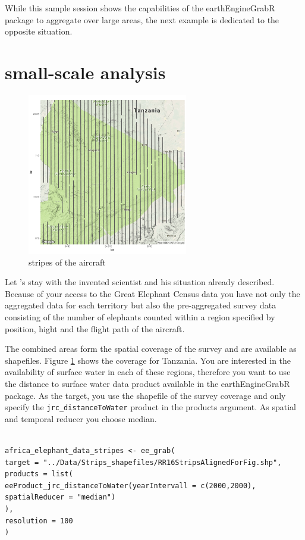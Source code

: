 While this sample session shows the capabilities of the earthEngineGrabR package to aggregate over large areas, the next example is dedicated to the opposite situation. 

\section{small-scale analysis}

\begin{figure}
	\begin{center}
		\includegraphics[width=7cm]{images/stripes-cropped.pdf}
		\caption{stripes of the aircraft}
		\label{stripes}
	\end{center}
\end{figure}


Let 's stay with the invented scientist and his situation already described. Because of your access to the Great Elephant Census data you have not only the aggregated data for each territory but also the pre-aggregated survey data consisting of the number of elephants counted within a region specified by position, hight and the flight path of the aircraft.
	

The combined areas form the spatial coverage of the survey and are available as shapefiles.
Figure \ref{stripes} shows the coverage for Tanzania. You are interested in the availability of surface water in each of these regions, therefore you want to use the distance to surface water data product available in the earthEngineGrabR package. 
As the target, you use the shapefile of the survey coverage and only specify the \texttt{jrc\_distanceToWater} product in the products argument. As spatial and temporal reducer you choose median. 

\begin{lstlisting}

africa_elephant_data_stripes <- ee_grab(
target = "../Data/Strips_shapefiles/RR16StripsAlignedForFig.shp", 
products = list(
eeProduct_jrc_distanceToWater(yearIntervall = c(2000,2000), spatialReducer = "median")
),
resolution = 100
)
\end{lstlisting}



